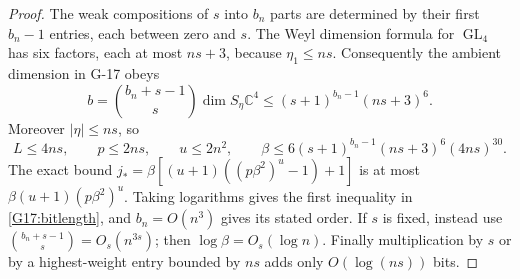 \documentclass[11pt,a4paper]{article}
\theoremstyle{definition}\newtheorem{definition}{Definition}
\begin{document}
\begin{proof}
The weak compositions of $s$ into $b_n$ parts are determined by their
first $b_n-1$ entries, each between zero and $s$. The Weyl dimension
formula for $\operatorname{GL}_4$ has six factors, each at most $ns+3$,
because $\eta_1\leq ns$. Consequently the ambient dimension in G-17 obeys
\[
 b=\binom{b_n+s-1}{s}\dim S_\eta\mathbb C^4
   \leq(s+1)^{b_n-1}(ns+3)^6.
\]
Moreover $|\eta|\leq ns$, so
\[
 L\leq4ns,\qquad p\leq2ns,\qquad u\leq2n^2,
 \qquad
 \beta\leq6(s+1)^{b_n-1}(ns+3)^6(4ns)^{30}.
\]
The exact bound
$j_*=\beta[(u+1)((p\beta^2)^u-1)+1]$
is at most $\beta(u+1)(p\beta^2)^u$. Taking logarithms gives
the first inequality in \eqref{G17:bitlength}, and $b_n=O(n^3)$
gives its stated order. If $s$ is fixed, instead use
$\binom{b_n+s-1}{s}=O_s(n^{3s})$; then $\log\beta=O_s(\log n)$.
Finally multiplication by $s$ or by a highest-weight entry bounded
by $ns$ adds only $O(\log(ns))$ bits.
\end{proof}
\end{document}
